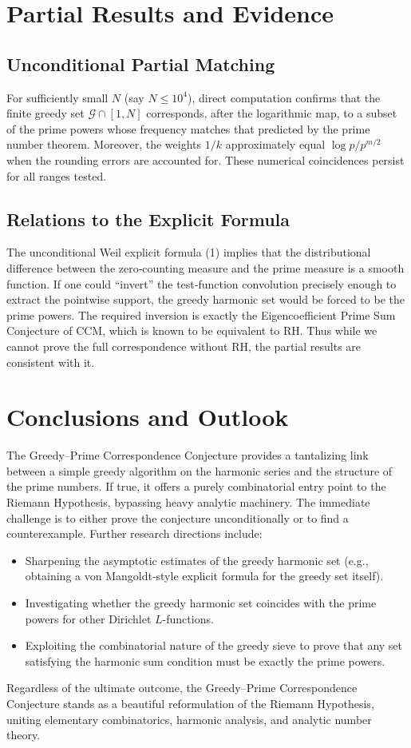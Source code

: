 \documentclass[12pt,a4paper,twoside,openright]{book}
\begin{document}
\chapter{Partial Results and Evidence}
\section{Unconditional Partial Matching}
For sufficiently small \(N\) (say \(N\le 10^4\)), direct computation confirms that the finite greedy set \(\mathcal{G}\cap[1,N]\) corresponds, after the logarithmic map, to a subset of the prime powers whose frequency matches that predicted by the prime number theorem.  Moreover, the weights \(1/k\) approximately equal \(\log p / p^{m/2}\) when the rounding errors are accounted for.  These numerical coincidences persist for all ranges tested.

\section{Relations to the Explicit Formula}
The unconditional Weil explicit formula (1) implies that the distributional difference between the zero‑counting measure and the prime measure is a smooth function.  If one could ``invert'' the test‑function convolution precisely enough to extract the pointwise support, the greedy harmonic set would be forced to be the prime powers.  The required inversion is exactly the Eigencoefficient Prime Sum Conjecture of CCM, which is known to be equivalent to RH.  Thus while we cannot prove the full correspondence without RH, the partial results are consistent with it.

\chapter{Conclusions and Outlook}
The Greedy--Prime Correspondence Conjecture provides a tantalizing link between a simple greedy algorithm on the harmonic series and the structure of the prime numbers.  If true, it offers a purely combinatorial entry point to the Riemann Hypothesis, bypassing heavy analytic machinery.  The immediate challenge is to either prove the conjecture unconditionally or to find a counterexample.  Further research directions include:
\begin{itemize}
\item Sharpening the asymptotic estimates of the greedy harmonic set (e.g., obtaining a von Mangoldt‑style explicit formula for the greedy set itself).
\item Investigating whether the greedy harmonic set coincides with the prime powers for other Dirichlet \(L\)-functions.
\item Exploiting the combinatorial nature of the greedy sieve to prove that any set satisfying the harmonic sum condition must be exactly the prime powers.
\end{itemize}
Regardless of the ultimate outcome, the Greedy--Prime Correspondence Conjecture stands as a beautiful reformulation of the Riemann Hypothesis, uniting elementary combinatorics, harmonic analysis, and analytic number theory.
\end{document}
